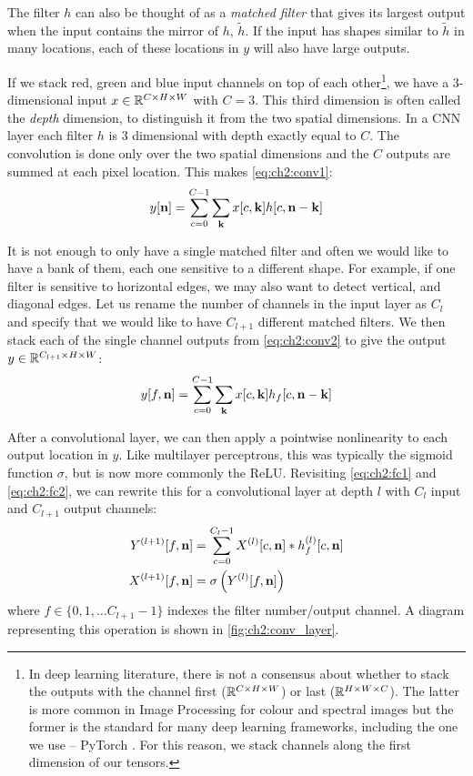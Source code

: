 The filter $h$ can also be thought of as a \emph{matched filter}
that gives its largest output when the input contains the mirror of $h$, $\tilde{h}$. If the input has
shapes similar to $\tilde{h}$ in many locations, each of these locations in $y$ will
also have large outputs.

If we stack red, green and blue input channels on top of each other\footnote{In deep
learning literature, there is not a consensus about whether to stack the outputs
with the channel first ($\reals[C\x H\x W]$) or last ($\reals[H\x W\x C]$). The
latter is more common in Image Processing for colour and spectral images but
the former is the standard for many deep learning frameworks, including the one
we use -- PyTorch \cite{paszke_automatic_2017}. For this reason, we stack
channels along the first dimension of our tensors.}, we have a
3-dimensional input $x \in \reals[C\x H\x W]$ with $C=3$.
This third dimension is often called the \emph{depth} dimension, to distinguish
it from the two spatial dimensions. In a CNN layer each filter $h$ is 3
dimensional with depth exactly equal to $C$. The convolution is
done only over the two spatial dimensions
and the $C$ outputs are summed at each pixel location. This makes
\eqref{eq:ch2:conv1}:
\begin{equation}
  y[\nn] = \sum_{c=0}^{C-1} \sum_{\mathbf{k}} x[c, \mathbf{k}]h[c, \nn-\mathbf{k}]
  \label{eq:ch2:conv2}
\end{equation}

It is not enough to only have a single matched filter and often we would like to
have a bank of them, each one sensitive to a different shape. For example, if
one filter is sensitive to horizontal edges, we may also want to detect vertical, and
diagonal edges. Let us rename the number of channels in the input layer as
$C_{l}$ and specify that we would like to have $C_{l+1}$ different matched
filters. We then stack each of the single channel outputs from
\eqref{eq:ch2:conv2} to give the output $y \in \reals[C_{l+1} \x H\x W]$:
%
\begin{equation}
  y[f, \nn] = \sum_{c=0}^{C-1} \sum_{\mathbf{k}} x[c, \mathbf{k}]h_f[c, \nn-\mathbf{k}]
  \label{eq:ch2:conv3}
\end{equation}

After a convolutional layer, we can then apply a pointwise nonlinearity to
each output location in $y$. Like multilayer perceptrons, this was typically the
sigmoid function $\sigma$, but is now more commonly the ReLU. Revisiting
\eqref{eq:ch2:fc1} and
\eqref{eq:ch2:fc2}, we can rewrite this for a convolutional layer at depth $l$
with $C_l$ input and $C_{l+1}$ output channels:
\begin{align}
  Y^{(l+1)}[f, \nn] &= \sum_{c=0}^{C_l-1} X^{(l)}[c, \nn] \conv h^{(l)}_f[c, \nn]
    \label{eq:ch2:conv4}\\
    X^{(l+1)}[f, \nn] &= \sigma\left(Y^{(l)}[f, \nn]\right) \label{eq:ch2:conv4a}
\end{align}
where $f \in \{0, 1,\ldots C_{l+1}-1\}$ indexes the filter number/output channel. A diagram
representing this operation is shown in \autoref{fig:ch2:conv_layer}.

